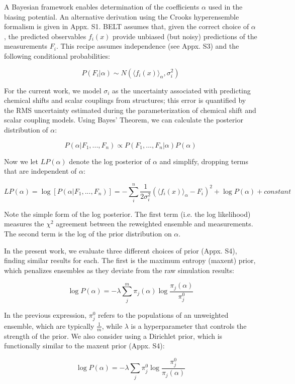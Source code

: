 \documentclass[journal=jacsat,manuscript=article]{achemso}
\begin{document}
A Bayesian framework enables determination of the coefficients $\alpha$ used in the biasing potential.  An alternative derivation using the Crooks hyperensemble formalism \cite{crooks2007beyond} is given in Appx. S1.  BELT assumes that, given the correct choice of $\alpha$, the predicted observables $f_i(x)$ provide unbiased (but noisy) predictions of the measurements $F_i$.  This recipe assumes independence (see Appx. S3) and the following conditional probabilities:

$$P(F_i | \alpha) \sim N(\langle f_i(x)\rangle _\alpha, \sigma_i^2)$$

For the current work, we model $\sigma_i$ as the uncertainty associated with predicting chemical shifts and scalar couplings from structures; this error is quantified by the RMS uncertainty estimated during the parameterization of chemical shift and scalar coupling models.  Using Bayes' Theorem, we can calculate the posterior distribution of $\alpha$:

$$P(\alpha | F_1, ..., F_n) \propto P(F_1, ..., F_n | \alpha) P(\alpha)$$

Now we let $LP(\alpha)$ denote the log posterior of $\alpha$ and simplify, dropping terms that are independent of $\alpha$:

$$LP(\alpha) = \log[ P(\alpha|F_1, ..., F_n)] = -\sum_i^n \frac{1}{2\sigma_i^2}(\langle f_i(x)\rangle _\alpha - F_i)^2 + \log P(\alpha) + constant$$

Note the simple form of the log posterior.  The first term (i.e. the log likelihood) measures the $\chi^2$ agreement between the reweighted ensemble and measurements.  The second term is the log of the prior distribution on $\alpha$.  

In the present work, we evaluate three different choices of prior (Appx. S4), finding similar results for each.  The first is the maximum entropy (maxent) prior, which penalizes ensembles as they deviate from the raw simulation results:

$$\log P(\alpha) = -\lambda \sum_j^m \pi_j(\alpha) \log \frac{\pi_j(\alpha)}{\pi_j^0}$$

In the previous expression, $\pi_j^0$ refers to the populations of an unweighted ensemble, which are typically $\frac{1}{m}$, while $\lambda$ is a hyperparameter that controls the strength of the prior.  We also consider using a Dirichlet prior, which is functionally similar to the maxent prior (Appx. S4):

$$\log P(\alpha) = -\lambda \sum_j \pi_j^0 \log \frac{\pi_j^0}{\pi_j(\alpha)}$$
\end{document}
